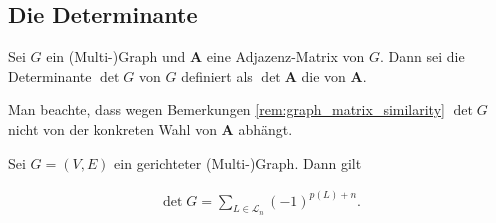 

        \subsection{Die Determinante}

            \begin{definition} \label{def:det}

                Sei $G$ ein (Multi-)Graph und $\mathbf A$ eine Adjazenz-Matrix von $G$.
                Dann sei die Determinante $\det G$ von $G$ definiert als $\det \mathbf A$ die von $\mathbf A$.

            \end{definition}

            Man beachte, dass wegen Bemerkungen \ref{rem:graph_matrix_similarity} $\det G$ nicht von der konkreten Wahl von $\mathbf A$ abhängt.

            \begin{theorem} \label{thm:det}

                Sei $G = (V, E)$ ein gerichteter (Multi-)Graph.
                Dann gilt

                \begin{align} \label{eq:det_directed}
                    \det G
                    =
                    \sum_{L \in \mathcal L_n}
                        (-1)^{p(L) + n}.
                \end{align}

            \end{theorem}

